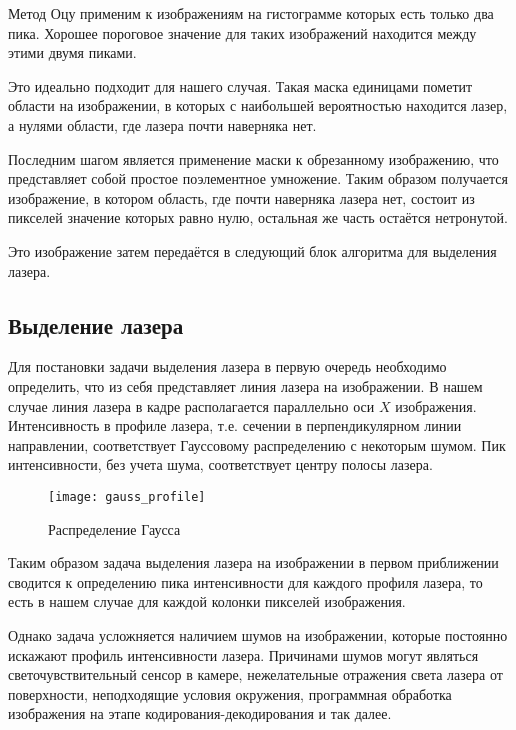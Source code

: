             Метод Оцу применим к изображениям на гистограмме которых есть только два пика. Хорошее пороговое значение для таких изображений находится между этими двумя пиками\cite{opencvTHRESH}.
            
            Это идеально подходит для нашего случая. Такая маска единицами пометит области на изображении, в которых с наибольшей вероятностью находится лазер, а нулями области, где лазера почти наверняка нет.
            
            Последним шагом является применение маски к обрезанному изображению, что представляет собой простое поэлементное умножение. Таким образом получается изображение, в котором область, где почти наверняка лазера нет, состоит из пикселей значение которых равно нулю, остальная же часть остаётся нетронутой.

            Это изображение затем передаётся в следующий блок алгоритма для выделения лазера.

        \subsection{Выделение лазера}
            Для постановки задачи выделения лазера в первую очередь необходимо определить, что из себя представляет линия лазера на изображении. В нашем случае линия лазера в кадре располагается параллельно оси $ X $ изображения. Интенсивность в профиле лазера, т.е. сечении в перпендикулярном линии направлении, соответствует Гауссовому распределению\cite{Qi2013, Molder2014} с некоторым шумом. Пик интенсивности, без учета шума, соответствует центру полосы лазера.
            \begin{wrapfigure}{l}{0.4\linewidth}
                \centering
                \texttt{[image: gauss\_profile]}
                \caption{Распределение Гаусса}
                \label{pic:gauss_profile}
            \end{wrapfigure}
            Таким образом задача выделения лазера на изображении в первом приближении сводится к определению пика интенсивности для каждого профиля лазера, то есть в нашем случае для каждой колонки пикселей изображения.
            
            Однако задача усложняется наличием шумов на изображении, которые постоянно искажают профиль интенсивности лазера. Причинами шумов могут являться светочувствительный сенсор в камере, нежелательные отражения света лазера от поверхности, неподходящие условия окружения, программная обработка изображения на этапе кодирования-декодирования и так далее.
            
